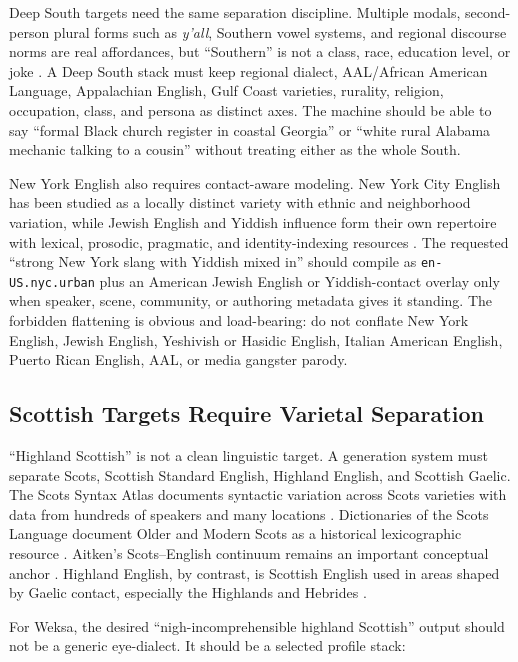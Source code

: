 \documentclass[11pt]{article}
\begin{document}
Deep South targets need the same separation discipline. Multiple modals,
second-person plural forms such as \emph{y'all}, Southern vowel systems, and
regional discourse norms are real affordances, but ``Southern'' is not a class,
race, education level, or joke \cite{ygdpMultipleModals,anae}. A Deep South
stack must keep regional dialect, AAL/African American Language, Appalachian
English, Gulf Coast varieties, rurality, religion, occupation, class, and
persona as distinct axes. The machine should be able to say ``formal Black
church register in coastal Georgia'' or ``white rural Alabama mechanic talking
to a cousin'' without treating either as the whole South.

New York English also requires contact-aware modeling. New York City English
has been studied as a locally distinct variety with ethnic and neighborhood
variation, while Jewish English and Yiddish influence form their own repertoire
with lexical, prosodic, pragmatic, and identity-indexing resources
\cite{newmanNycEnglish,becker2009nyc,burdin2018,benorJewishEnglish}.
The requested ``strong New York slang with Yiddish mixed in'' should compile as
\texttt{en-US.nyc.urban} plus an American Jewish English or Yiddish-contact
overlay only when speaker, scene, community, or authoring metadata gives it
standing. The forbidden flattening is obvious and load-bearing: do not conflate
New York English, Jewish English, Yeshivish or Hasidic English, Italian
American English, Puerto Rican English, AAL, or media gangster parody.

\subsection{Scottish Targets Require Varietal Separation}

``Highland Scottish'' is not a clean linguistic target. A generation system must
separate Scots, Scottish Standard English, Highland English, and Scottish
Gaelic. The Scots Syntax Atlas documents syntactic variation across Scots
varieties with data from hundreds of speakers and many locations
\cite{scotsSyntaxAtlas}. Dictionaries of the Scots Language document Older and
Modern Scots as a historical lexicographic resource \cite{dsl}. Aitken's
Scots--English continuum remains an important conceptual anchor
\cite{aitken1984}. Highland English, by contrast, is Scottish English used in
areas shaped by Gaelic contact, especially the Highlands and Hebrides
\cite{highlandEnglish}.

For Weksa, the desired ``nigh-incomprehensible highland Scottish'' output should
not be a generic eye-dialect. It should be a selected profile stack:
\end{document}
